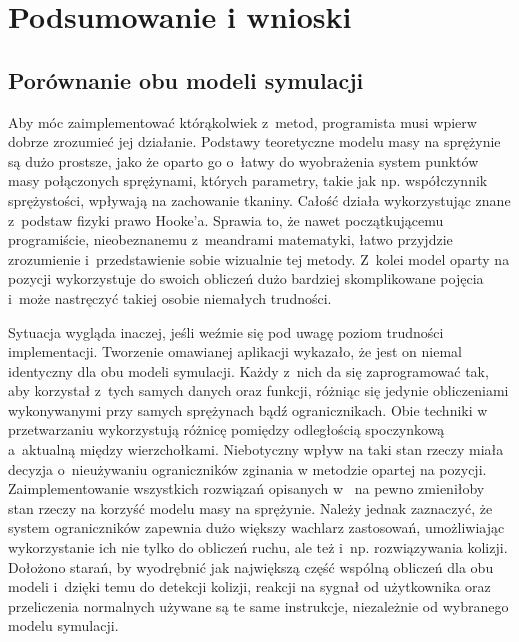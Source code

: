 \chapter{Podsumowanie i wnioski}
\label{t:wnioski}

	\section{Porównanie obu modeli symulacji}
	\label{t:wnioski:porownanie}
	
	
	Aby móc zaimplementować którąkolwiek z~metod, programista musi wpierw dobrze zrozumieć jej działanie. Podstawy teoretyczne modelu masy na sprężynie są dużo prostsze, jako że oparto go o~łatwy do wyobrażenia system punktów masy połączonych sprężynami, których parametry, takie jak np. współczynnik sprężystości, wpływają na zachowanie tkaniny. Całość działa wykorzystując znane z~podstaw fizyki prawo Hooke'a. Sprawia to, że nawet początkującemu programiście, nieobeznanemu z~meandrami matematyki, łatwo przyjdzie zrozumienie i~przedstawienie sobie wizualnie tej metody. Z~kolei model oparty na pozycji wykorzystuje do swoich obliczeń dużo bardziej skomplikowane pojęcia i~może nastręczyć takiej osobie niemałych trudności.
	
	Sytuacja wygląda inaczej, jeśli weźmie się pod uwagę poziom trudności implementacji. Tworzenie omawianej aplikacji wykazało, że jest on niemal identyczny dla obu modeli symulacji. Każdy z~nich da się zaprogramować tak, aby korzystał z~tych samych danych oraz funkcji, różniąc się jedynie obliczeniami wykonywanymi przy samych sprężynach bądź ogranicznikach. Obie techniki w przetwarzaniu wykorzystują różnicę pomiędzy odległością spoczynkową a~aktualną między wierzchołkami. Niebotyczny wpływ na taki stan rzeczy miała decyzja o~nieużywaniu ograniczników zginania w metodzie opartej na pozycji. Zaimplementowanie wszystkich rozwiązań opisanych w~\cite{posbased} na pewno zmieniłoby stan rzeczy na korzyść modelu masy na sprężynie. Należy jednak zaznaczyć, że system ograniczników zapewnia dużo większy wachlarz zastosowań, umożliwiając wykorzystanie ich nie tylko do obliczeń ruchu, ale też i~np. rozwiązywania kolizji. Dołożono starań, by wyodrębnić jak największą część wspólną obliczeń dla obu modeli i~dzięki temu do detekcji kolizji, reakcji na sygnał od użytkownika oraz przeliczenia normalnych używane są te same instrukcje, niezależnie od wybranego modelu symulacji.
	
